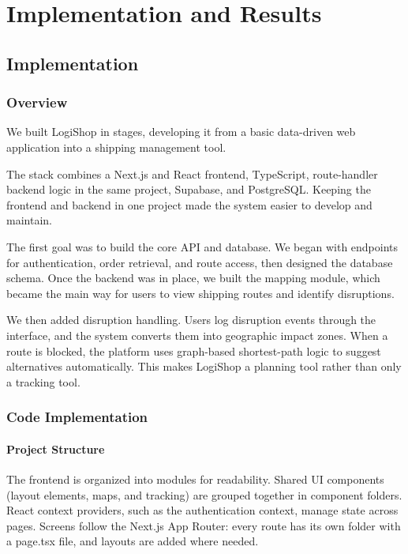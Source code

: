 \chapter{Implementation and Results}

\section{Implementation}

\subsection{Overview}

We built LogiShop in stages, developing it from a basic data-driven web application into a shipping management tool.

The stack combines a Next.js and React frontend, TypeScript, route-handler backend logic in the same project, Supabase, and PostgreSQL. Keeping the frontend and backend in one project made the system easier to develop and maintain.

The first goal was to build the core API and database. We began with endpoints for authentication, order retrieval, and route access, then designed the database schema. Once the backend was in place, we built the mapping module, which became the main way for users to view shipping routes and identify disruptions.

We then added disruption handling. Users log disruption events through the interface, and the system converts them into geographic impact zones. When a route is blocked, the platform uses graph-based shortest-path logic to suggest alternatives automatically. This makes LogiShop a planning tool rather than only a tracking tool.

\subsection{Code Implementation}

\subsubsection{Project Structure}

The frontend is organized into modules for readability. Shared UI components (layout elements, maps, and tracking) are grouped together in component folders. React context providers, such as the authentication context, manage state across pages. Screens follow the Next.js App Router: every route has its own folder with a page.tsx file, and layouts are added where needed.

